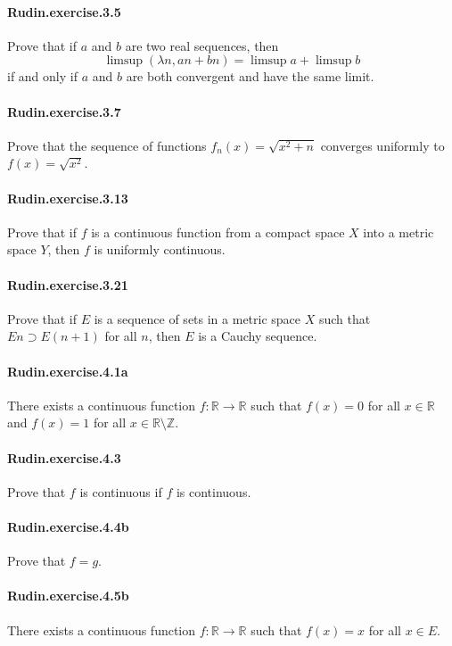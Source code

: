 \documentclass{article}
\begin{document}
{\paragraph{Rudin.exercise.3.5} Prove that if $a$ and $b$ are two real sequences, then
  $$
  \limsup (λ n, a n + b n) = \limsup a + \limsup b
  $$
  if and only if $a$ and $b$ are both convergent and have the same limit.

\paragraph{Rudin.exercise.3.7} Prove that the sequence of functions $f_n(x) = \sqrt{x^2 + n}$ converges uniformly to $f(x) = \sqrt{x^2}$.

\paragraph{Rudin.exercise.3.13} Prove that if $f$ is a continuous function from a compact space $X$ into a metric space $Y$, then $f$ is uniformly continuous.

\paragraph{Rudin.exercise.3.21} Prove that if $E$ is a sequence of sets in a metric space $X$ such that $E n ⊃ E (n + 1)$ for all $n$, then $E$ is a Cauchy sequence.

\paragraph{Rudin.exercise.4.1a} There exists a continuous function $f : ℝ → ℝ$ such that $f(x) = 0$ for all $x \in ℝ$ and $f(x) = 1$ for all $x \in ℝ \setminus ℤ$.

\paragraph{Rudin.exercise.4.3} Prove that $f$ is continuous if $f$ is continuous.

\paragraph{Rudin.exercise.4.4b} Prove that $f = g$.

\paragraph{Rudin.exercise.4.5b} There exists a continuous function $f : ℝ → ℝ$ such that $f(x) = x$ for all $x \in E$.

}
\end{document}
